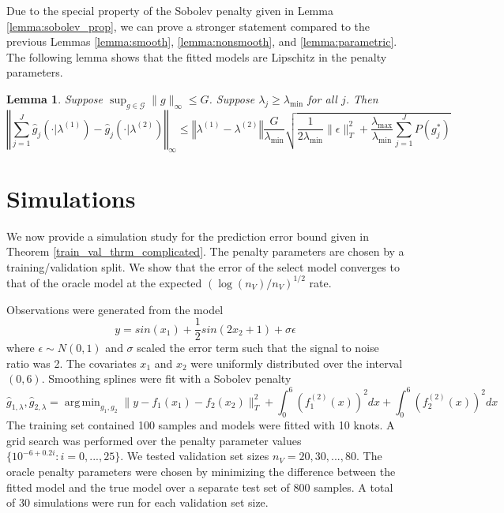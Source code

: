 \documentclass[12pt]{article}
\newtheorem{lemma}{Lemma}
\DeclareMathOperator*{\argmin}{arg\,min}
\begin{document}
Due to the special property of the Sobolev penalty given in Lemma \ref{lemma:sobolev_prop}, we can prove a stronger statement compared to the previous Lemmas \ref{lemma:smooth}, \ref{lemma:nonsmooth}, and \ref{lemma:parametric}. The following lemma shows that the fitted models are Lipschitz in the penalty parameters.

\begin{lemma}
\label{lemma:sobolev}
Suppose $\sup_{g \in \mathcal{G}} \|g\|_\infty \le G$.
Suppose $\lambda_j \ge \lambda_{\min}$ for all $j$.
Then
\begin{equation}
\left\Vert \sum_{j=1}^J \hat{g}_j(\cdot|\lambda^{(1)}) - \hat{g}_j(\cdot|\lambda^{(2)}) \right\Vert _{\infty}
\le
\left\Vert \lambda^{(1)}-\lambda^{(2)}\right\Vert
\frac{G}{\lambda_{\min}}
\sqrt{\frac{1}{2\lambda_{\min}}\|\epsilon\|_{T}^{2}
+\frac{\lambda_{\max}}{\lambda_{\min}}\sum_{j=1}^{J}P\left(g_j^{*}\right)}
\end{equation}
\end{lemma}

\section{Simulations}\label{sec:simulations}

We now provide a simulation study for the prediction error bound given in Theorem \ref{train_val_thrm_complicated}. The penalty parameters are chosen by a training/validation split. We show that the error of the select model converges to that of the oracle model at the expected $(\log(n_V)/n_V)^{1/2}$ rate.

Observations were generated from the model
\begin{equation}
y = sin(x_1) + \frac{1}{2} sin(2 x_2 + 1) + \sigma \epsilon
\end{equation}
where $\epsilon \sim N(0,1)$ and $\sigma$ scaled the error term such that the signal to noise ratio was 2.
The covariates $x_1$ and $x_2$ were uniformly distributed over the interval $(0,6)$.
Smoothing splines were fit with a Sobolev penalty
\begin{equation}
\hat{g}_{1, \lambda}, \hat{g}_{2, \lambda} = \argmin_{g_1, g_2} \| y - f_1(x_1) - f_2(x_2) \|_T^2 + \int_0^6 (f_1^{(2)}(x))^2 dx + \int_0^6 (f_2^{(2)}(x))^2 dx
\end{equation}
The training set contained 100 samples and models were fitted with 10 knots. A grid search was performed over the penalty parameter values $\{10^{-6 + 0.2i}: i = 0, ..., 25 \}$. We tested validation set sizes $n_V = 20, 30, ..., 80$. The oracle penalty parameters were chosen by minimizing the difference between the fitted model and the true model over a separate test set of 800 samples. A total of 30 simulations were run for each validation set size.
\end{document}
